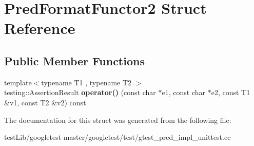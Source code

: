 \hypertarget{structPredFormatFunctor2}{}\section{Pred\+Format\+Functor2 Struct Reference}
\label{structPredFormatFunctor2}
\subsection*{Public Member Functions}
\begin{DoxyCompactItemize}
\item 
\mbox{\label{structPredFormatFunctor2_a0169e0105e15d5c63bece2a20646b22b}} 
{\footnotesize template$<$typename T1 , typename T2 $>$ }\\testing\+::\+Assertion\+Result {\bfseries operator()} (const char $\ast$e1, const char $\ast$e2, const T1 \&v1, const T2 \&v2) const
\end{DoxyCompactItemize}


The documentation for this struct was generated from the following file\+:\begin{DoxyCompactItemize}
\item 
test\+Lib/googletest-\/master/googletest/test/gtest\+\_\+pred\+\_\+impl\+\_\+unittest.\+cc\end{DoxyCompactItemize}

